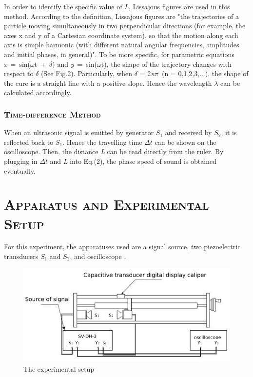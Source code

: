 \documentclass[a4paper,12pt]{article}
\begin{document}
\newpage

In order to identify the specific value of \textit{L}, Lissajous figures are used in this method. According to the definition, Lissajous figures are "the trajectories of a particle moving simultaneously in two perpendicular directions (for example, the axes x and y of a Cartesian coordinate system), so that the motion along each axis is simple harmonic (with different natural angular frequencies, amplitudes and initial phases, in general)"\cite{labmanual}. To be more specific, for parametric equations \textit{x}~=~sin(\textit{$\omega$}t~+~$\delta$) and  \textit{y}~=~sin(\textit{$\omega$}t), the shape of the trajectory changes with respect to $\delta$ (See Fig.2). Particularly, when $\delta$ = 2\textit{n}$\pi$~(n = 0,1,2,3,...), the shape of the cure is a straight line with a positive slope. Hence the wavelength \textit{$\lambda$} can be calculated accordingly.

\subsubsection{\textsc{Time-difference Method}}
When an ultrasonic signal is emitted by generator \textit{$S_1$} and received by \textit{$S_2$}, it is reflected back to \textit{$S_1$}. Hence the travelling time \textit{$\Delta t$} can be shown on the oscilloscope. Then, the distance \textit{L} can be read directly from the ruler. By plugging in \textit{$\Delta t$} and \textit{L} into Eq.(2), the phase speed of sound is obtained eventually.


\section{\textsc{Apparatus and Experimental Setup}}
For this experiment, the apparatuses used are a signal source, two piezoelectric transducers \textit{$S_1$} and \textit{$S_2$}, and oscilloscope \cite{labmanual}.

\begin{figure}[h] 
    \centering
    \includegraphics[width=1\textwidth]{Fig6} 
    \caption{The experimental setup \cite{labmanual}} 
\end{figure}
\end{document}
